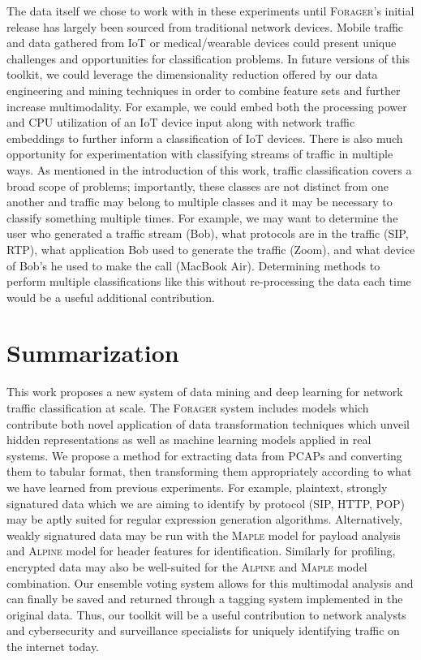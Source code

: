The data itself we chose to work with in these experiments until \textsc{Forager}'s initial release has largely been sourced from traditional network devices. Mobile traffic and data gathered from IoT or medical/wearable devices could present unique challenges and opportunities for classification problems. In future versions of this toolkit, we could leverage the dimensionality reduction offered by our data engineering and mining techniques in order to combine feature sets and further increase multimodality. For example, we could embed both the processing power and CPU utilization of an IoT device input along with network traffic embeddings to further inform a classification of IoT devices. There is also much opportunity for experimentation with classifying streams of traffic in multiple ways. As mentioned in the introduction of this work, traffic classification covers a broad scope of problems; importantly, these classes are not distinct from one another and traffic may belong to multiple classes and it may be necessary to classify something multiple times. For example, we may want to determine the user who generated a traffic stream (Bob), what protocols are in the traffic (SIP, RTP), what application Bob used to generate the traffic (Zoom), and what device of Bob's he used to make the call (MacBook Air). Determining methods to perform multiple classifications like this without re-processing the data each time would be a useful additional contribution.

\section{Summarization}
This work proposes a new system of data mining and deep learning for network traffic classification at scale. The \textsc{Forager} system includes models which contribute both novel application of data transformation techniques which unveil hidden representations as well as machine learning models applied in real systems. We propose a method for extracting data from PCAPs and converting them to tabular format, then transforming them appropriately according to what we have learned from previous experiments. For example, plaintext, strongly signatured data which we are aiming to identify by protocol (SIP, HTTP, POP) may be aptly suited for regular expression generation algorithms. Alternatively, weakly signatured data may be run with the \textsc{Maple} model for payload analysis and \textsc{Alpine} model for header features for identification. Similarly for profiling, encrypted data may also be well-suited for the \textsc{Alpine} and \textsc{Maple} model combination. Our ensemble voting system allows for this multimodal analysis and can finally be saved and returned through a tagging system implemented in the original data. Thus, our toolkit will be a useful contribution to network analysts and cybersecurity and surveillance specialists for uniquely identifying traffic on the internet today.
